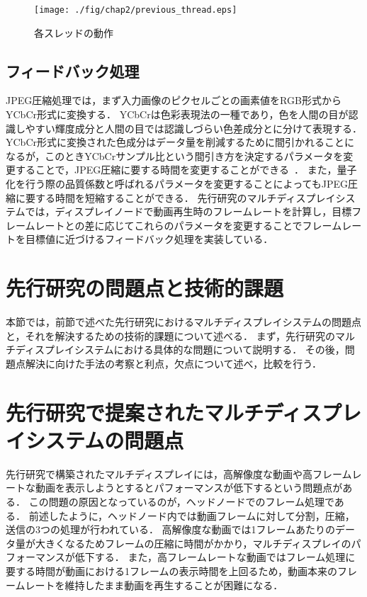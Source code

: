   \begin{center}
    \begin{figure}[H]
        \hspace*{\fill}
        \texttt{[image: ./fig/chap2/previous\_thread.eps]}
        \hspace*{\fill}
        \caption{各スレッドの動作}
        \label{thread_flow}
    \end{figure}
    \end{center}
   

\subsection*{フィードバック処理}

JPEG圧縮処理では，まず入力画像のピクセルごとの画素値をRGB形式からYCbCr形式に変換する．
YCbCrは色彩表現法の一種であり，色を人間の目が認識しやすい輝度成分と人間の目では認識しづらい色差成分とに分けて表現する\cite{YCbCr}．
YCbCr形式に変換された色成分はデータ量を削減するために間引かれることになるが，このときYCbCrサンプル比という間引き方を決定するパラメータを変更することで，JPEG圧縮に要する時間を変更することができる~\cite{jpeg2}．
また，量子化を行う際の品質係数と呼ばれるパラメータを変更することによってもJPEG圧縮に要する時間を短縮することができる．
先行研究のマルチディスプレイシステムでは，ディスプレイノードで動画再生時のフレームレートを計算し，目標フレームレートとの差に応じてこれらのパラメータを変更することでフレームレートを目標値に近づけるフィードバック処理を実装している．

\section{先行研究の問題点と技術的課題}

本節では，前節で述べた先行研究におけるマルチディスプレイシステムの問題点と，それを解決するための技術的課題について述べる．
まず，先行研究のマルチディスプレイシステムにおける具体的な問題について説明する．
その後，問題点解決に向けた手法の考察と利点，欠点について述べ，比較を行う．

\section*{先行研究で提案されたマルチディスプレイシステムの問題点}

先行研究で構築されたマルチディスプレイには，高解像度な動画や高フレームレートな動画を表示しようとするとパフォーマンスが低下するという問題点がある．
この問題の原因となっているのが，ヘッドノードでのフレーム処理である．
前述したように，ヘッドノード内では動画フレームに対して分割，圧縮，送信の3つの処理が行われている．
高解像度な動画では1フレームあたりのデータ量が大きくなるためフレームの圧縮に時間がかかり，マルチディスプレイのパフォーマンスが低下する．
また，高フレームレートな動画ではフレーム処理に要する時間が動画における1フレームの表示時間を上回るため，動画本来のフレームレートを維持したまま動画を再生することが困難になる．

